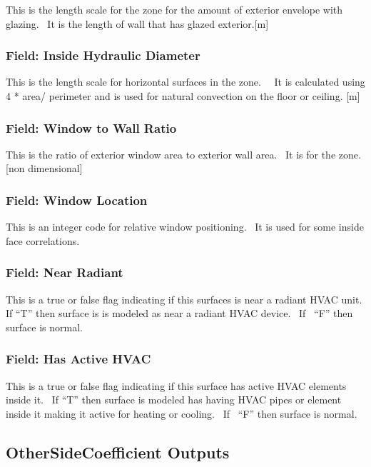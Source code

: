 This is the length scale for the zone for the amount of exterior envelope with glazing.~ It is the length of wall that has glazed exterior.{[}m{]}

\subsubsection{Field: Inside Hydraulic Diameter}\label{field-inside-hydraulic-diameter}

This is the length scale for horizontal surfaces in the zone.~~ It is calculated using 4 * area/ perimeter and is used for natural convection on the floor or ceiling. {[}m{]}

\subsubsection{Field: Window to Wall Ratio}\label{field-window-to-wall-ratio}

This is the ratio of exterior window area to exterior wall area.~ It is for the zone. {[}non dimensional{]}

\subsubsection{Field: Window Location}\label{field-window-location}

This is an integer code for relative window positioning.~ It is used for some inside face correlations.

\subsubsection{Field: Near Radiant}\label{field-near-radiant}

This is a true or false flag indicating if this surfaces is near a radiant HVAC unit. If ``T'' then surface is is modeled as near a radiant HVAC device.~ If~ ``F'' then surface is normal.

\subsubsection{Field: Has Active HVAC}\label{field-has-active-hvac}

This is a true or false flag indicating if this surface has active HVAC elements inside it.~ If ``T'' then surface is modeled has having HVAC pipes or element inside it making it active for heating or cooling.~ If~ ``F'' then surface is normal.

\subsection{OtherSideCoefficient Outputs}\label{othersidecoefficient-outputs}


